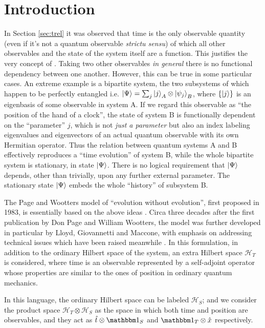 \section{Introduction}

In Section \ref{sec:trel} it was observed that time is the only observable quantity
(even if it's not a quantum observable \emph{strictu sensu})
of which all other observables and the state of the system itself are a function.
This justifies the very concept of .
Taking two other observables \emph{in general} there is no functional dependency
between one another.
However, this can be true in some particular cases.
An extreme example is a bipartite system,
the two subsystems of which happen to be
perfectly entangled i.e. $ \ket{\Psi} = \sum_{j} \ket{j}_{A} \otimes \ket{\psi_{j}}_{B} $,
where $\qty{\ket{j}}$ is an eigenbasis of some observable in system A.
If we regard this observable as ``the position of the hand of a clock'',
the state of system B is functionally dependent on the ``parameter'' $j$,
which is not \emph{just a parameter} but also an index labeling
eigenvalues and eigenvectors of an actual quantum observable
with its own Hermitian operator.
Thus the relation between quantum systems A and B effectively
reproduces a ``time evolution'' of system B,
while the whole bipartite system
is stationary, in state
$\ket{\Psi}$.
There is no logical requirement that $\ket{\Psi}$
depends, other than trivially,
upon any further external parameter.
The stationary state $\ket{\Psi}$ embeds the whole ``history''
of subsystem B.

The Page and Wootters model of ``evolution without evolution'',
first proposed in 1983,
is essentially based on the above ideas \parencite{PageWootters}.
Circa three decades after the first publication by
Don Page and William Wootters, the model was further developed
in particular by Lloyd, Giovannetti and Maccone,
with emphasis on addressing technical issues which have been raised meanwhile
\parencite{Lloyd:Time}.
In this formulation,
in addition to the ordinary Hilbert space of the system,
an extra Hilbert space $\mathcal{H}_T$ is considered,
where time is an observable
represented by a self-adjoint operator
whose properties are similar to the ones of position
in ordinary quantum mechanics.

In this language, the ordinary Hilbert space can be labeled $\mathcal{H}_S$;
and we consider the product space $\mathcal{H}_T \otimes \mathcal{H}_S$ as
the space in which both time and position are observables, and they act as
$\hat{t} \otimes \idop_S$ and $\idop_T \otimes \hat{x}$
respectively.


